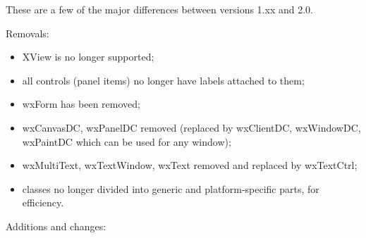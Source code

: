 These are a few of the major differences between versions 1.xx and 2.0.

Removals:

\begin{itemize}\itemsep=0pt
\item XView is no longer supported;
\item all controls (panel items) no longer have labels attached to them;
\item wxForm has been removed;
\item wxCanvasDC, wxPanelDC removed (replaced by wxClientDC, wxWindowDC, wxPaintDC which
can be used for any window);
\item wxMultiText, wxTextWindow, wxText removed and replaced by wxTextCtrl;
\item classes no longer divided into generic and platform-specific parts, for efficiency.
\end{itemize}

Additions and changes:

